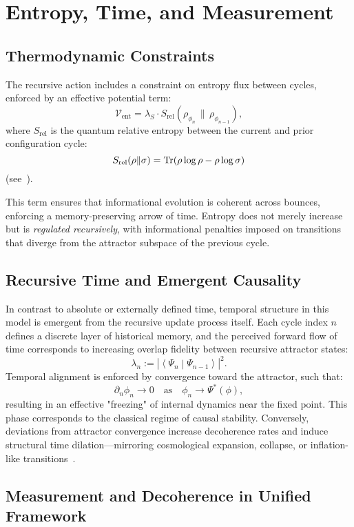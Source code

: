 \documentclass[11pt]{article}
\begin{document}
\section{Entropy, Time, and Measurement}

\subsection{Thermodynamic Constraints}

The recursive action includes a constraint on entropy flux between cycles, enforced by an effective potential term:
\[
\mathcal{V}_{\text{ent}} = \lambda_S \cdot S_{\text{rel}}(\rho_{\phi_n} \, \| \, \rho_{\phi_{n-1}}),
\]
where \( S_{\text{rel}} \) is the quantum relative entropy between the current and prior configuration cycle:
\[
S_{\text{rel}}(\rho \| \sigma) = \Tr(\rho \log \rho - \rho \log \sigma)
\]
(see~\cite{nielsen2010quantum}).

This term ensures that informational evolution is coherent across bounces, enforcing a memory-preserving arrow of time. Entropy does not merely increase but is \textit{regulated recursively}, with informational penalties imposed on transitions that diverge from the attractor subspace of the previous cycle.

\subsection{Recursive Time and Emergent Causality}

In contrast to absolute or externally defined time, temporal structure in this model is emergent from the recursive update process itself. Each cycle index $n$ defines a discrete layer of historical memory, and the perceived forward flow of time corresponds to increasing overlap fidelity between recursive attractor states:
\[
\lambda_n := \left| \left\langle \Psi_n \middle| \Psi_{n-1} \right\rangle \right|^2.
\]
Temporal alignment is enforced by convergence toward the attractor, such that:
\[
\partial_n \phi_n \to 0 \quad \text{as} \quad \phi_n \to \Psi^*(\phi),
\]
resulting in an effective "freezing" of internal dynamics near the fixed point. This phase corresponds to the classical regime of causal stability. Conversely, deviations from attractor convergence increase decoherence rates and induce structural time dilation—mirroring cosmological expansion, collapse, or inflation-like transitions~\cite{ashtekar2006quantum}.

\subsection{Measurement and Decoherence in Unified Framework}
\end{document}
